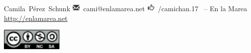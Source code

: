     \newpage
    \thispagestyle{empty}

    \begin{flushleft}\hbox{\Large{Camila Pérez Schunk}}    
    \vspace{5mm}
    \hbox{\includegraphics[width=4mm]{assets/images/email.png}\large{ cami@enlamarea.net}}
    \vspace{2mm}
    \hbox{\includegraphics[width=4mm]{assets/images/fb.png}\large{ /camichan.17}}
    \vspace{5mm}
    \copyleft \, \the\year -- En la Marea
    \url{http://enlamarea.net}

    \vfill

    \centering
    \includegraphics[width=3cm]{assets/images/la_copia_comparte_cultura.png}

    \end{flushleft}
   \newpage
